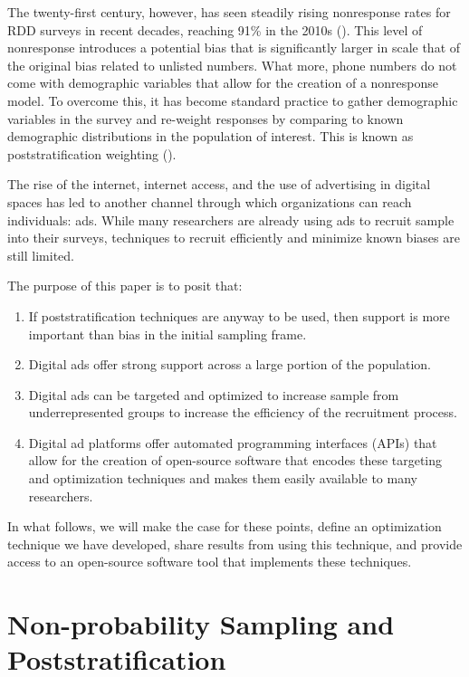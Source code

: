 \documentclass[a4paper,12pt]{article}
\theoremstyle{proposition}
\begin{document}
The twenty-first century, however, has seen steadily rising nonresponse rates for RDD surveys in recent decades, reaching 91\% in the 2010s (\cite{Keeter2017,Shirani-Mehr2018}). This level of nonresponse introduces a potential bias that is significantly larger in scale that of the original bias related to unlisted numbers. What more, phone numbers do not come with demographic variables that allow for the creation of a nonresponse model. To overcome this, it has become standard practice to gather demographic variables in the survey and re-weight responses by comparing to known demographic distributions in the population of interest. This is known as poststratification weighting (\cite{Gelman1997}).

The rise of the internet, internet access, and the use of advertising in digital spaces has led to another channel through which organizations can reach individuals: ads. While many researchers are already using ads to recruit sample into their surveys, techniques to recruit efficiently and minimize known biases are still limited.

The purpose of this paper is to posit that:

\begin{enumerate}
\item If poststratification techniques are anyway to be used, then support is more important than bias in the initial sampling frame.
\item Digital ads offer strong support across a large portion of the population.
\item Digital ads can be targeted and optimized to increase sample from underrepresented groups to increase the efficiency of the recruitment process.
\item Digital ad platforms offer automated programming interfaces (APIs) that allow for the creation of open-source software that encodes these targeting and optimization techniques and makes them easily available to many researchers.
\end{enumerate}

In what follows, we will make the case for these points, define an optimization technique we have developed, share results from using this technique, and provide access to an open-source software tool that implements these techniques.


\section{Non-probability Sampling and Poststratification}
\end{document}

